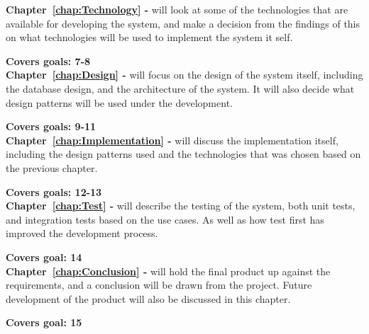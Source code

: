 \textbf{Chapter~\ref{chap:Technology} - } will look at some of the technologies that are available for developing the system, and make a decision from the findings of this on what technologies will be used to implement the system it self.

\textbf{Covers goals: 7-8}\\

\textbf{Chapter~\ref{chap:Design} - } will focus on the design of the system itself, including the database design, and the architecture of the system. It will also decide what design patterns will be used under the development.

\textbf{Covers goals: 9-11}\\

\textbf{Chapter~\ref{chap:Implementation} - } will discuss the implementation itself, including the design patterns used and the technologies that was chosen based on the previous chapter.

\textbf{Covers goals: 12-13}\\

\textbf{Chapter~\ref{chap:Test} - } will describe the testing of the system, both unit tests, and integration tests based on the use cases. As well as how test first has improved the development process.

\textbf{Covers goal: 14}\\

\textbf{Chapter~\ref{chap:Conclusion} - } will hold the final product up against the requirements, and a conclusion will be drawn from the project. Future development of the product will also be discussed in this chapter.

\textbf{Covers goal: 15}
